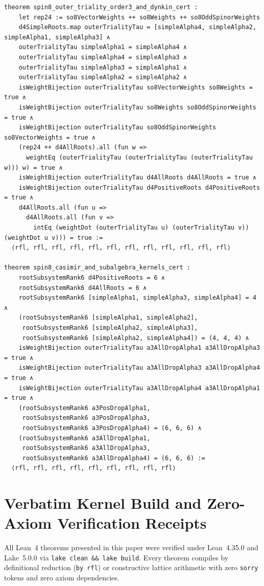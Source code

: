 \documentclass[11pt,a4paper]{article}
\begin{document}
\begin{lstlisting}[caption={Full $24$-root system, order-$3$ outer triality $\tau$, and subalgebra Gram theorems in \texttt{Spin8LieAlgebraTriality.lean}.}]
theorem spin8_outer_triality_order3_and_dynkin_cert :
    let rep24 := so8VectorWeights ++ so8Weights ++ so8OddSpinorWeights
    d4SimpleRoots.map outerTrialityTau = [simpleAlpha4, simpleAlpha2, simpleAlpha1, simpleAlpha3] ∧
    outerTrialityTau simpleAlpha1 = simpleAlpha4 ∧
    outerTrialityTau simpleAlpha4 = simpleAlpha3 ∧
    outerTrialityTau simpleAlpha3 = simpleAlpha1 ∧
    outerTrialityTau simpleAlpha2 = simpleAlpha2 ∧
    isWeightBijection outerTrialityTau so8VectorWeights so8Weights = true ∧
    isWeightBijection outerTrialityTau so8Weights so8OddSpinorWeights = true ∧
    isWeightBijection outerTrialityTau so8OddSpinorWeights so8VectorWeights = true ∧
    (rep24 ++ d4AllRoots).all (fun w =>
      weightEq (outerTrialityTau (outerTrialityTau (outerTrialityTau w))) w) = true ∧
    isWeightBijection outerTrialityTau d4AllRoots d4AllRoots = true ∧
    isWeightBijection outerTrialityTau d4PositiveRoots d4PositiveRoots = true ∧
    d4AllRoots.all (fun u =>
      d4AllRoots.all (fun v =>
        intEq (weightDot (outerTrialityTau u) (outerTrialityTau v)) (weightDot u v))) = true :=
  ⟨rfl, rfl, rfl, rfl, rfl, rfl, rfl, rfl, rfl, rfl, rfl, rfl⟩

theorem spin8_casimir_and_subalgebra_kernels_cert :
    rootSubsystemRank6 d4PositiveRoots = 6 ∧
    rootSubsystemRank6 d4AllRoots = 6 ∧
    rootSubsystemRank6 [simpleAlpha1, simpleAlpha3, simpleAlpha4] = 4 ∧
    (rootSubsystemRank6 [simpleAlpha1, simpleAlpha2],
     rootSubsystemRank6 [simpleAlpha2, simpleAlpha3],
     rootSubsystemRank6 [simpleAlpha2, simpleAlpha4]) = (4, 4, 4) ∧
    isWeightBijection outerTrialityTau a3AllDropAlpha1 a3AllDropAlpha3 = true ∧
    isWeightBijection outerTrialityTau a3AllDropAlpha3 a3AllDropAlpha4 = true ∧
    isWeightBijection outerTrialityTau a3AllDropAlpha4 a3AllDropAlpha1 = true ∧
    (rootSubsystemRank6 a3PosDropAlpha1,
     rootSubsystemRank6 a3PosDropAlpha3,
     rootSubsystemRank6 a3PosDropAlpha4) = (6, 6, 6) ∧
    (rootSubsystemRank6 a3AllDropAlpha1,
     rootSubsystemRank6 a3AllDropAlpha3,
     rootSubsystemRank6 a3AllDropAlpha4) = (6, 6, 6) :=
  ⟨rfl, rfl, rfl, rfl, rfl, rfl, rfl, rfl, rfl⟩
\end{lstlisting}

\appendix
\section{Verbatim Kernel Build and Zero-Axiom Verification Receipts}

All Lean~4 theorems presented in this paper were verified under Lean~4.35.0 and Lake~5.0.0 via \texttt{lake clean \&\& lake build}. Every theorem compiles by definitional reduction (\texttt{by rfl}) or constructive lattice arithmetic with zero \texttt{sorry} tokens and zero axiom dependencies.
\end{document}
